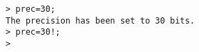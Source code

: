 \begin{center}\begin{minipage}{15cm}\begin{Verbatim}[frame=single]
> prec=30;
The precision has been set to 30 bits.
> prec=30!;
>  
\end{Verbatim}
\end{minipage}\end{center}
